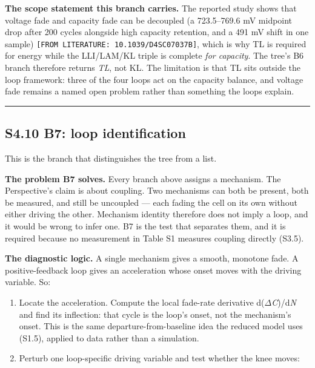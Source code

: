 \documentclass[11pt,a4paper]{article}
\begin{document}
\textbf{The scope statement this branch carries.} The reported study shows that voltage fade and capacity fade can be decoupled (a 723.5--769.6 mV midpoint drop after 200 cycles alongside high capacity retention, and a 491 mV shift in one sample) \texttt{[FROM LITERATU}\hspace{0pt}\texttt{RE: 10.1039/}\hspace{0pt}\texttt{D4SC07037B]}, which is why TL is required for energy while the LLI/LAM/KL triple is complete \emph{for capacity}. The tree's B6 branch therefore returns \emph{TL}, not KL. The limitation is that TL sits outside the loop framework: three of the four loops act on the capacity balance, and voltage fade remains a named open problem rather than something the loops explain.


\par\noindent\rule{\linewidth}{0.4pt}\par


\subsection*{S4.10 B7: loop identification}


This is the branch that distinguishes the tree from a list.


\textbf{The problem B7 solves.} Every branch above assigns a mechanism. The Perspective's claim is about coupling. Two mechanisms can both be present, both be measured, and still be uncoupled --- each fading the cell on its own without either driving the other. Mechanism identity therefore does not imply a loop, and it would be wrong to infer one. B7 is the test that separates them, and it is required because no measurement in Table S1 measures coupling directly (S3.5).


\textbf{The diagnostic logic.} A single mechanism gives a smooth, monotone fade. A positive-feedback loop gives an acceleration whose onset moves with the driving variable. So:


\begin{enumerate}
  \item Locate the acceleration. Compute the local fade-rate derivative d(\ensuremath{\Delta}\emph{C})/d\emph{N} and find its inflection: that cycle is the loop's onset, not the mechanism's onset. This is the same departure-from-baseline idea the reduced model uses (S1.5), applied to data rather than a simulation.
  \item Perturb one loop-specific driving variable and test whether the knee moves:
\end{enumerate}
\end{document}
